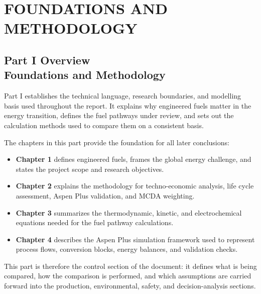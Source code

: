 \documentclass[12pt,twoside,openany]{book}
\let\cleardoublepage\clearpage
\begin{document}

\mainmatter


\part{FOUNDATIONS AND METHODOLOGY}

\cleardoublepage
{}
\chapter*{Part I Overview\\Foundations and Methodology}

Part I establishes the technical language, research boundaries, and modelling basis used throughout the report. It explains why engineered fuels matter in the energy transition, defines the fuel pathways under review, and sets out the calculation methods used to compare them on a consistent basis.

The chapters in this part provide the foundation for all later conclusions:

\begin{itemize}
    \item \textbf{Chapter 1} defines engineered fuels, frames the global energy challenge, and states the project scope and research objectives.
    \item \textbf{Chapter 2} explains the methodology for techno-economic analysis, life cycle assessment, Aspen Plus validation, and MCDA weighting.
    \item \textbf{Chapter 3} summarizes the thermodynamic, kinetic, and electrochemical equations needed for the fuel pathway calculations.
    \item \textbf{Chapter 4} describes the Aspen Plus simulation framework used to represent process flows, conversion blocks, energy balances, and validation checks.
\end{itemize}

This part is therefore the control section of the document: it defines what is being compared, how the comparison is performed, and which assumptions are carried forward into the production, environmental, safety, and decision-analysis sections.
\end{document}
